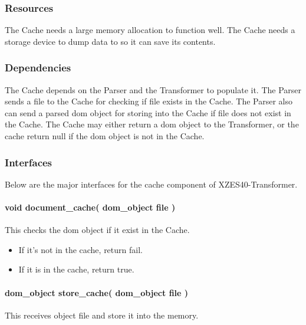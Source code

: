 \subsubsection{Resources}

The Cache needs a large memory allocation to function well.
The Cache needs a storage device to dump data to so it can save its contents.

\subsubsection{Dependencies}

The Cache depends on the Parser and the Transformer to populate it.
The Parser sends a file to the Cache for checking if file exists in the Cache.
The Parser also can send a parsed \gls{dom} object for storing into the Cache if file does not exist in the Cache.
The Cache may either return a \gls{dom} object to the Transformer, or the cache return null if the \gls{dom} object is not in the Cache.

\subsubsection{Interfaces}

Below are the major interfaces for the cache component of XZES40-Transformer.

\paragraph{void document\_cache( dom\_object file )} 
This checks the \gls{dom} object if it exist in the Cache.

\begin{itemize}
    \item If it's not in the cache, return fail. 
    \item If it is in the cache, return true.
\end{itemize}

\paragraph{dom\_object store\_cache( dom\_object file )} 
This receives object file and store it into the memory.

